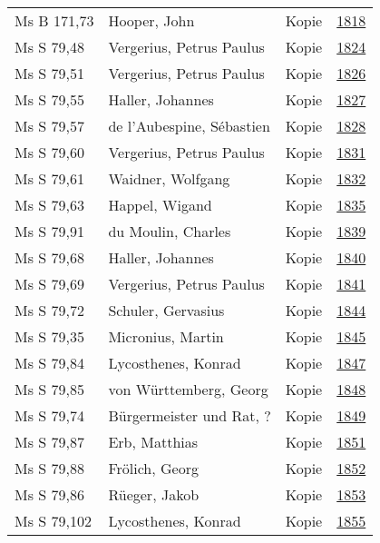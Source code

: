 \documentclass[10pt,a4paper,landscape]{report}
\begin{document}
\begin{longtable}{p{16cm}p{4cm}lr}
Ms B 171,73	&	Hooper, John	&	Kopie	&	\href{http://130.60.24.72/assignment/1818}{1818}\\
Ms S 79,48	&	Vergerius, Petrus Paulus	&	Kopie	&	\href{http://130.60.24.72/assignment/1824}{1824}\\
Ms S 79,51	&	Vergerius, Petrus Paulus	&	Kopie	&	\href{http://130.60.24.72/assignment/1826}{1826}\\
Ms S 79,55	&	Haller, Johannes	&	Kopie	&	\href{http://130.60.24.72/assignment/1827}{1827}\\
Ms S 79,57	&	de l'Aubespine, Sébastien	&	Kopie	&	\href{http://130.60.24.72/assignment/1828}{1828}\\
Ms S 79,60	&	Vergerius, Petrus Paulus	&	Kopie	&	\href{http://130.60.24.72/assignment/1831}{1831}\\
Ms S 79,61	&	Waidner, Wolfgang	&	Kopie	&	\href{http://130.60.24.72/assignment/1832}{1832}\\
Ms S 79,63	&	Happel, Wigand	&	Kopie	&	\href{http://130.60.24.72/assignment/1835}{1835}\\
Ms S 79,91	&	du Moulin, Charles	&	Kopie	&	\href{http://130.60.24.72/assignment/1839}{1839}\\
Ms S 79,68	&	Haller, Johannes	&	Kopie	&	\href{http://130.60.24.72/assignment/1840}{1840}\\
Ms S 79,69	&	Vergerius, Petrus Paulus	&	Kopie	&	\href{http://130.60.24.72/assignment/1841}{1841}\\
Ms S 79,72	&	Schuler, Gervasius	&	Kopie	&	\href{http://130.60.24.72/assignment/1844}{1844}\\
Ms S 79,35	&	Micronius, Martin	&	Kopie	&	\href{http://130.60.24.72/assignment/1845}{1845}\\
Ms S 79,84	&	Lycosthenes, Konrad	&	Kopie	&	\href{http://130.60.24.72/assignment/1847}{1847}\\
Ms S 79,85	&	von Württemberg, Georg	&	Kopie	&	\href{http://130.60.24.72/assignment/1848}{1848}\\
Ms S 79,74	&	Bürgermeister und Rat, ?	&	Kopie	&	\href{http://130.60.24.72/assignment/1849}{1849}\\
Ms S 79,87	&	Erb, Matthias	&	Kopie	&	\href{http://130.60.24.72/assignment/1851}{1851}\\
Ms S 79,88	&	Frölich, Georg	&	Kopie	&	\href{http://130.60.24.72/assignment/1852}{1852}\\
Ms S 79,86	&	Rüeger, Jakob	&	Kopie	&	\href{http://130.60.24.72/assignment/1853}{1853}\\
Ms S 79,102	&	Lycosthenes, Konrad	&	Kopie	&	\href{http://130.60.24.72/assignment/1855}{1855}\\

\end{longtable}
\end{document}
